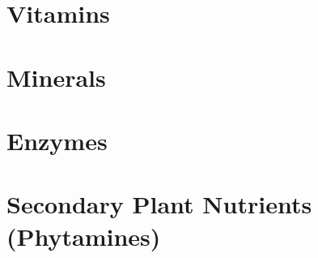 \documentclass[../main.tex]{subfiles}
\begin{document}


\section{Vitamins}



\section{Minerals}


 
\section{Enzymes}



\section{Secondary Plant Nutrients (Phytamines)}


\end{document}
